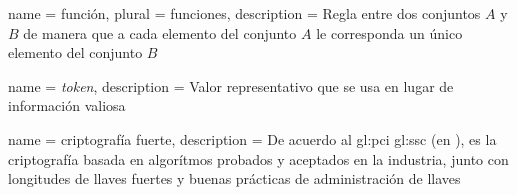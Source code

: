 {
  name = función,
  plural = funciones,
  description = {
    Regla entre dos conjuntos $A$ y $B$ de manera que a cada elemento del
    conjunto $A$ le corresponda un único elemento del conjunto $B$%
  }
}

{
  name = \textit{token},
  description = {
    Valor representativo que se usa en lugar de información valiosa%
  }
}

{
  name = criptografía fuerte,
  description = {
    De acuerdo al \gls{gl:pci} \gls{gl:ssc} (en \cite{dss_glosario}), es la
    criptografía basada en algorítmos probados y aceptados en la industria,
    junto con longitudes de llaves fuertes y buenas prácticas de
    administración de llaves%
  }
}

\glsaddall
